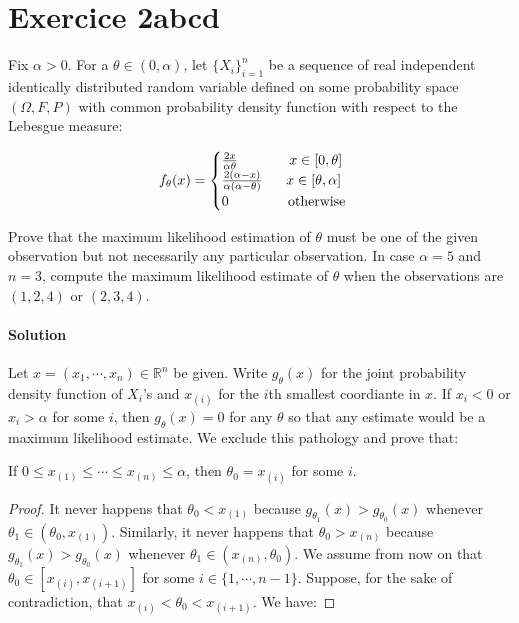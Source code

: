 \documentclass[../main.tex]{subfiles}
\begin{document}
\section{Exercice 2abcd}
\begin{CJK*}{UTF8}{gbsn}
Fix $\alpha > 0$. For a $\theta \in (0, \alpha)$,
let $\{X_i\}_{i=1}^n$ be a sequence of real independent identically distributed random variable 
defined on some probability space $(\Omega, F, P)$
with common probability density function with respect to the Lebesgue measure:

\begin{equation*}
    f_{\theta}(x) = 
    \begin{cases}
        \frac{2x}{\alpha \theta} \tab[1.3cm] x \in [0, \theta] \\
        \frac{2(\alpha-x)}{\alpha(\alpha - \theta)} \tab[0.6cm] x \in [\theta, \alpha] \\
        0 \tab[1.5cm] \text{otherwise}
    \end{cases}
\end{equation*}

Prove that the maximum likelihood estimation of $\theta$ must be one of the given observation
but not necessarily any particular observation. 
In case $\alpha = 5$ and $n=3$, compute the maximum likelihood estimate of $\theta$ when the 
observations are $(1,2,4)$ or $(2,3,4)$.  

\smallskip
\paragraph{Solution}
Let $x = (x_1, \cdots, x_n) \in \mathbb{R}^n$ be given. 
Write $g_{\theta}(x)$ for the joint probability density function of $X_i$'s 
and $x_{(i)}$ for the $i$th smallest coordiante in $x$.
If $x_i < 0$ or $x_i > \alpha$ for some $i$, then $g_{\theta}(x)=0$ for any $\theta$ so that 
any estimate would be a maximum likelihood estimate.
We exclude this pathology and prove that:

\begin{theorem}
If $0 \leqslant x_{(1)} \leqslant \cdots \leqslant x_{(n)} \leqslant \alpha$, then $\theta_0 = x_{(i)}$ for some $i$.
\end{theorem}

\begin{proof}
It never happens that $\theta_0 < x_{(1)}$
because $g_{\theta_1}(x) > g_{\theta_0}(x)$ whenever $\theta_1 \in (\theta_0,x_{(1)})$.
Similarly, it never happens that $\theta_0 > x_{(n)}$ because
$g_{\theta_1}(x) > g_{\theta_0}(x)$ whenever $\theta_1 \in (x_{(n)}, \theta_0)$.
We assume from now on that $\theta_0 \in [x_{(i)}, x_{(i+1)}]$ for some $i \in \{1,\cdots, n-1\}$.
Suppose, for the sake of contradiction, that $x_{(i)} < \theta_0 < x_{(i+1)}$. We have:


\end{proof}
\end{CJK*}
\end{document}
